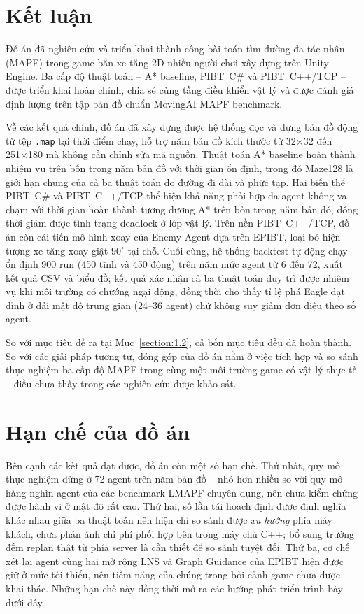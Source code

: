 \documentclass[../DoAn.tex]{subfiles}
\begin{document}
\section{Kết luận}

Đồ án đã nghiên cứu và triển khai thành công bài toán tìm đường đa tác nhân (MAPF)
trong game bắn xe tăng 2D nhiều người chơi xây dựng trên Unity Engine. Ba cấp độ
thuật toán -- A* baseline, PIBT~C\# và PIBT~C++/TCP -- được triển khai hoàn chỉnh,
chia sẻ cùng tầng điều khiển vật lý và được đánh giá định lượng trên tập bản đồ
chuẩn MovingAI MAPF benchmark.

Về các kết quả chính, đồ án đã xây dựng được hệ thống đọc và dựng bản đồ động từ tệp
\texttt{.map} tại thời điểm chạy, hỗ trợ năm bản đồ kích thước từ 32×32 đến 251×180 mà
không cần chỉnh sửa mã nguồn. Thuật toán A* baseline hoàn thành nhiệm vụ trên bốn trong
năm bản đồ với thời gian ổn định, trong đó Maze128 là giới hạn chung của cả ba thuật toán
do đường đi dài và phức tạp. Hai biến thể PIBT~C\# và PIBT~C++/TCP thể hiện khả năng phối
hợp đa agent không va chạm với thời gian hoàn thành tương đương A* trên bốn trong năm bản
đồ, đồng thời giảm được tình trạng deadlock ở lớp vật lý. Trên nền PIBT~C++/TCP, đồ án còn
cải tiến mô hình xoay của Enemy Agent dựa trên EPIBT, loại bỏ hiện tượng xe tăng xoay giật
$90^\circ$ tại chỗ. Cuối cùng, hệ thống backtest tự động chạy ổn định 900 run (450 tĩnh và
450 động) trên năm mức agent từ 6 đến 72, xuất kết quả CSV và biểu đồ; kết quả xác nhận cả
ba thuật toán duy trì được nhiệm vụ khi môi trường có chướng ngại động, đồng thời cho thấy tỉ lệ
phá Eagle đạt đỉnh ở dải mật độ trung gian (24--36 agent) chứ không suy giảm đơn điệu theo số agent.

So với mục tiêu đề ra tại Mục~\ref{section:1.2}, cả bốn mục tiêu đều đã hoàn thành. So với
các giải pháp tương tự, đóng góp của đồ án nằm ở việc tích hợp và so sánh thực nghiệm ba
cấp độ MAPF trong cùng một môi trường game có vật lý thực tế -- điều chưa thấy trong các
nghiên cứu được khảo sát.

\section{Hạn chế của đồ án}

Bên cạnh các kết quả đạt được, đồ án còn một số hạn chế. Thứ nhất, quy mô thực nghiệm dừng ở 72
agent trên năm bản đồ -- nhỏ hơn nhiều so với quy mô hàng nghìn agent của các benchmark LMAPF
chuyên dụng, nên chưa kiểm chứng được hành vi ở mật độ rất cao. Thứ hai, số lần tái hoạch định
được định nghĩa khác nhau giữa ba thuật toán nên hiện chỉ so sánh được \emph{xu hướng} phía máy
khách, chưa phản ánh chi phí phối hợp bên trong máy chủ C++; bổ sung trường đếm replan thật từ
phía server là cần thiết để so sánh tuyệt đối. Thứ ba, cơ chế xét lại agent cùng hai mở rộng LNS và
Graph Guidance của EPIBT hiện được giữ ở mức tối thiểu, nên tiềm năng của chúng trong bối cảnh game
chưa được khai thác. Những hạn chế này đồng thời mở ra các hướng phát triển trình bày dưới đây.
\end{document}
